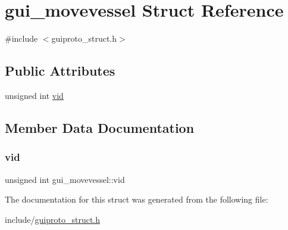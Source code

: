 \hypertarget{structgui__movevessel}{}\section{gui\+\_\+movevessel Struct Reference}
\label{structgui__movevessel}


{\ttfamily \#include $<$guiproto\+\_\+struct.\+h$>$}

\subsection*{Public Attributes}
\begin{DoxyCompactItemize}
\item 
unsigned int \mbox{\hyperlink{structgui__movevessel_a738354c52d28d4a642c67d525e6bb9eb}{vid}}
\end{DoxyCompactItemize}


\subsection{Member Data Documentation}
\mbox{\label{structgui__movevessel_a738354c52d28d4a642c67d525e6bb9eb}} 
\subsubsection{\texorpdfstring{vid}{vid}}
{\footnotesize\ttfamily unsigned int gui\+\_\+movevessel\+::vid}



The documentation for this struct was generated from the following file\+:\begin{DoxyCompactItemize}
\item 
include/\mbox{\hyperlink{guiproto__struct_8h}{guiproto\+\_\+struct.\+h}}\end{DoxyCompactItemize}
